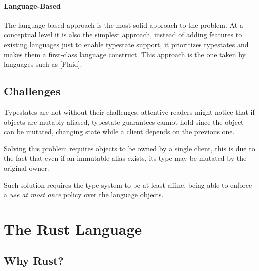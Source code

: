 \paragraph{Language-Based}
The language-based approach is the most solid approach to the problem.
At a conceptual level it is also the simplest approach,
instead of adding features to existing languages just to enable typestate support,
it prioritizes typestates and makes them a first-class language construct.
This approach is the one taken by languages such as [Plaid].


\subsection{Challenges}

Typestates are not without their challenges,
attentive readers might notice that if objects are mutably aliased,
typestate guarantees cannot hold since the object can be mutated,
changing state while a client depends on the previous one.


Solving this problem requires objects to be owned by a single client,
this is due to the fact that even if an immutable alias exists,
its type may be mutated by the original owner.

Such solution requires the type system to be at least affine,
being able to enforce a \emph{use at most once} policy over the language objects.



\section{The Rust Language}\label{sec:rust}

\subsection{Why Rust?}\label{sec:rust:why}